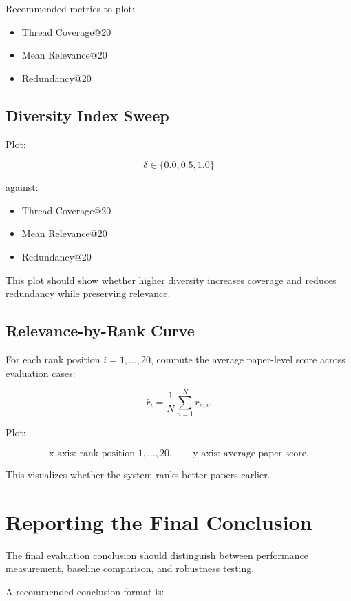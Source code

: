 \documentclass[11pt]{article}
\begin{document}
Recommended metrics to plot:

\begin{itemize}[leftmargin=*]
    \item Thread Coverage@20
    \item Mean Relevance@20
    \item Redundancy@20
\end{itemize}

\subsection{Diversity Index Sweep}

Plot:

\[
\delta \in \{0.0, 0.5, 1.0\}
\]

against:

\begin{itemize}[leftmargin=*]
    \item Thread Coverage@20
    \item Mean Relevance@20
    \item Redundancy@20
\end{itemize}

This plot should show whether higher diversity increases coverage and reduces redundancy while preserving relevance.

\subsection{Relevance-by-Rank Curve}

For each rank position $i=1,\ldots,20$, compute the average paper-level score across evaluation cases:

\[
\bar{r}_i =
\frac{1}{N}
\sum_{n=1}^{N}
r_{n,i}.
\]

Plot:

\[
\text{x-axis: rank position } 1,\ldots,20,
\qquad
\text{y-axis: average paper score}.
\]

This visualizes whether the system ranks better papers earlier.

\section{Reporting the Final Conclusion}

The final evaluation conclusion should distinguish between performance measurement, baseline comparison, and robustness testing.

A recommended conclusion format is:
\end{document}
